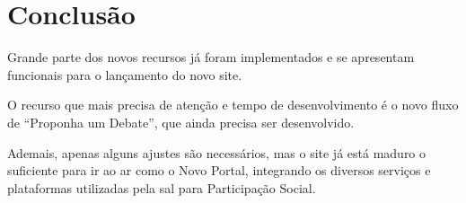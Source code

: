 \chapter{Conclusão}
Grande parte dos novos recursos já foram implementados e se apresentam funcionais para o lançamento do novo site.

O recurso que mais precisa de atenção e tempo de desenvolvimento é o novo fluxo de ``Proponha um Debate'', que ainda precisa ser desenvolvido.

Ademais, apenas alguns ajustes são necessários, mas o site já está maduro o suficiente para ir ao ar como o Novo Portal, integrando os diversos serviços e plataformas utilizadas pela \gls{sal} para Participação Social.